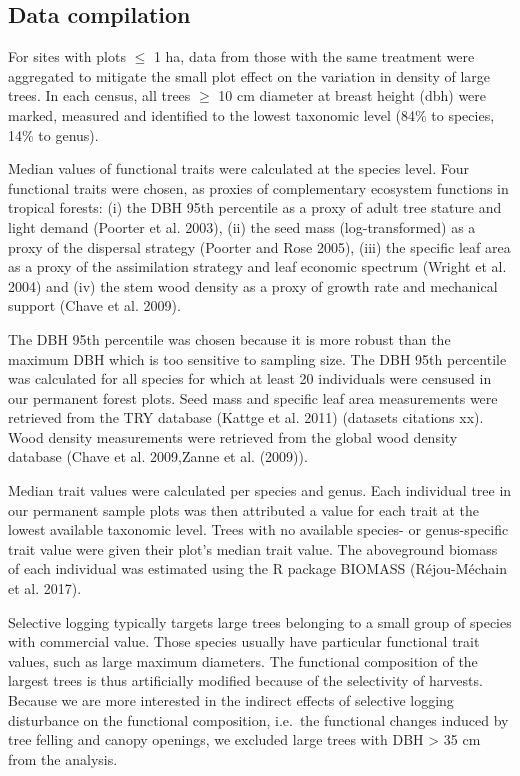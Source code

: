 \documentclass[]{elsarticle} %
\begin{document}
\subsection{Data compilation}\label{data-compilation}

For sites with plots \(\leq\) 1 ha, data from those with the same
treatment were aggregated to mitigate the small plot effect on the
variation in density of large trees. In each census, all trees \(\geq\)
10 cm diameter at breast height (dbh) were marked, measured and
identified to the lowest taxonomic level (84\% to species, 14\% to
genus).

Median values of functional traits were calculated at the species level.
Four functional traits were chosen, as proxies of complementary
ecosystem functions in tropical forests: (i) the DBH 95th percentile as
a proxy of adult tree stature and light demand (Poorter et al. 2003),
(ii) the seed mass (log-transformed) as a proxy of the dispersal
strategy (Poorter and Rose 2005), (iii) the specific leaf area as a
proxy of the assimilation strategy and leaf economic spectrum (Wright et
al. 2004) and (iv) the stem wood density as a proxy of growth rate and
mechanical support (Chave et al. 2009).

The DBH 95th percentile was chosen because it is more robust than the
maximum DBH which is too sensitive to sampling size. The DBH 95th
percentile was calculated for all species for which at least 20
individuals were censused in our permanent forest plots. Seed mass and
specific leaf area measurements were retrieved from the TRY database
(Kattge et al. 2011) (datasets citations xx). Wood density measurements
were retrieved from the global wood density database (Chave et al.
2009,Zanne et al. (2009)).

Median trait values were calculated per species and genus. Each
individual tree in our permanent sample plots was then attributed a
value for each trait at the lowest available taxonomic level. Trees with
no available species- or genus-specific trait value were given their
plot's median trait value. The aboveground biomass of each individual
was estimated using the R package BIOMASS (Réjou-Méchain et al. 2017).

Selective logging typically targets large trees belonging to a small
group of species with commercial value. Those species usually have
particular functional trait values, such as large maximum diameters. The
functional composition of the largest trees is thus artificially
modified because of the selectivity of harvests. Because we are more
interested in the indirect effects of selective logging disturbance on
the functional composition, i.e.~the functional changes induced by tree
felling and canopy openings, we excluded large trees with DBH
\textgreater{} 35 cm from the analysis.
\end{document}

